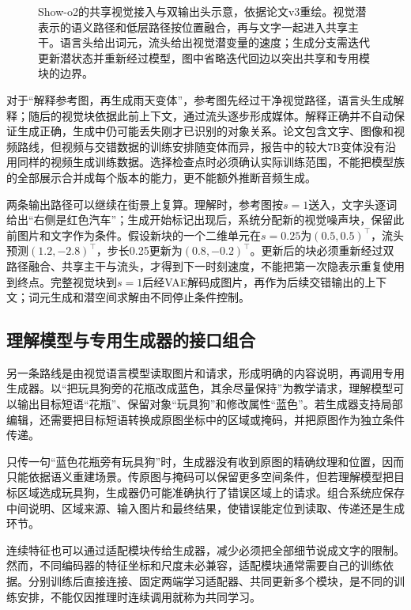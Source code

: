 \begin{figure}[htbp]
  \centering
  
  \caption{Show-o2的共享视觉接入与双输出头示意，依据论文v3重绘。视觉潜表示的语义路径和低层路径按位置融合，再与文字一起进入共享主干。语言头给出词元，流头给出视觉潜变量的速度；生成分支需迭代更新潜状态并重新经过模型，图中省略迭代回边以突出共享和专用模块的边界。}
  \label{fig:vision-showo-heads}
\end{figure}
\FloatBarrier

对于“解释参考图，再生成雨天变体”，参考图先经过干净视觉路径，语言头生成解释；随后的视觉块依据此前上下文，通过流头逐步形成媒体。解释正确并不自动保证生成正确，生成中仍可能丢失刚才已识别的对象关系。论文包含文字、图像和视频路线，但视频与交错数据的训练安排随变体而异，报告中的较大7B变体没有沿用同样的视频生成训练数据。选择检查点时必须确认实际训练范围，不能把模型族的全部展示合并成每个版本的能力，更不能额外推断音频生成。

两条输出路径可以继续在街景上复算。理解时，参考图按$s=1$送入，文字头逐词给出“右侧是红色汽车”；生成开始标记出现后，系统分配新的视觉噪声块，保留此前图片和文字作为条件。假设新块的一个二维单元在$s=0.25$为$(0.5,0.5)^\top$，流头预测$(1.2,-2.8)^\top$，步长0.25更新为$(0.8,-0.2)^\top$。更新后的块必须重新经过双路径融合、共享主干与流头，才得到下一时刻速度，不能把第一次隐表示重复使用到终点。完整视觉块到$s=1$后经VAE解码成图片，再作为后续交错输出的上下文；词元生成和潜空间求解由不同停止条件控制。

\subsection{理解模型与专用生成器的接口组合}
\label{sec:vision-models-composition}

另一条路线是由视觉语言模型读取图片和请求，形成明确的内容说明，再调用专用生成器。以“把玩具狗旁的花瓶改成蓝色，其余尽量保持”为教学请求，理解模型可以输出目标短语“花瓶”、保留对象“玩具狗”和修改属性“蓝色”。若生成器支持局部编辑，还需要把目标短语转换成原图坐标中的区域或掩码，并把原图作为独立条件传递。

只传一句“蓝色花瓶旁有玩具狗”时，生成器没有收到原图的精确纹理和位置，因而只能依据语义重建场景。传原图与掩码可以保留更多空间条件，但若理解模型把目标区域选成玩具狗，生成器仍可能准确执行了错误区域上的请求。组合系统应保存中间说明、区域来源、输入图片和最终结果，使错误能定位到读取、传递还是生成环节。

连续特征也可以通过适配模块传给生成器，减少必须把全部细节说成文字的限制。然而，不同编码器的特征坐标和尺度未必兼容，适配模块通常需要自己的训练依据。分别训练后直接连接、固定两端学习适配器、共同更新多个模块，是不同的训练安排，不能仅因推理时连续调用就称为共同学习。


